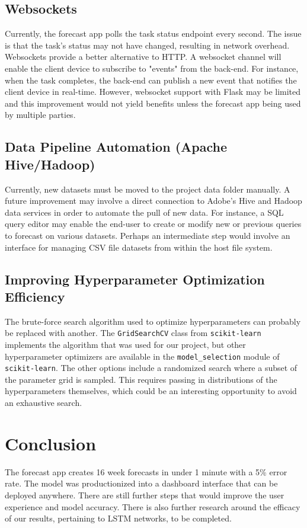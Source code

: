 \documentclass[11pt, oneside]{article}
\begin{document}
\subsection{Websockets}
Currently, the forecast app polls the task status endpoint every second. The issue is that the task's status may not have changed, resulting in network overhead. Websockets provide a better alternative to HTTP. A websocket channel will enable the client device to subscribe to "events" from the back-end. For instance, when the task completes, the back-end can publish a new event that notifies the client device in real-time. However, websocket support with Flask may be limited and this improvement would not yield benefits unless the forecast app being used by multiple parties.

\subsection{Data Pipeline Automation (Apache Hive/Hadoop)}
Currently, new datasets must be moved to the project data folder manually. A future improvement may involve a direct connection to Adobe's Hive and Hadoop data services in order to automate the pull of new data. For instance, a SQL query editor may enable the end-user to create or modify new or previous queries to forecast on various datasets. Perhaps an intermediate step would involve an interface for managing CSV file datasets from within the host file system.

\subsection{Improving Hyperparameter Optimization Efficiency}
\label{improving_hyperparameter_optimization_efficiency}
The brute-force search algorithm used to optimize hyperparameters can probably be replaced with another. The \texttt{GridSearchCV} class from \texttt{scikit-learn} implements the algorithm that was used for our project, but other hyperparameter optimizers are available in the \texttt{model\_selection} module of \texttt{scikit-learn}. The other options include a randomized search where a subset of the parameter grid is sampled. This requires passing in distributions of the hyperparameters themselves, which could be an interesting opportunity to avoid an exhaustive search.

\section{Conclusion}
The forecast app creates 16 week forecasts in under 1 minute with a 5\% error rate. The model was productionized into a dashboard interface that can be deployed anywhere. There are still further steps that would improve the user experience and model accuracy. There is also further research around the efficacy of our results, pertaining to LSTM networks, to be completed.
\end{document}

